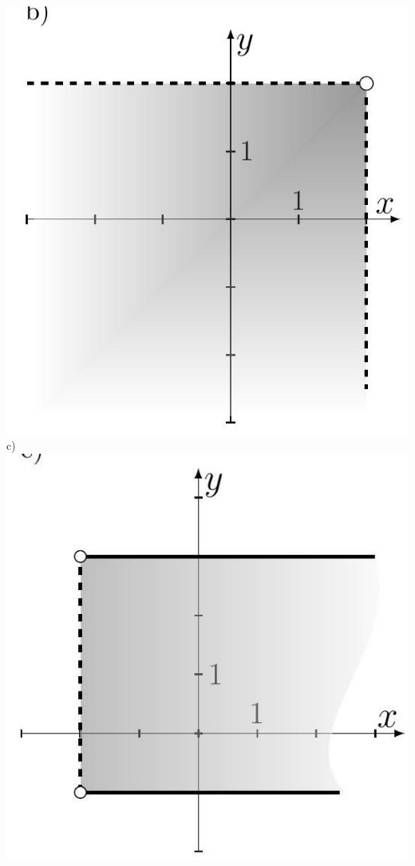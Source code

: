 \documentclass[10pt]{article}
\begin{document}
\begin{enumerate}
\includegraphics[max width=\textwidth, center]{2024_11_21_8f01584889ff06348ae7g-068(1)}\\
c)\\
\includegraphics[max width=\textwidth, center]{2024_11_21_8f01584889ff06348ae7g-068}\\

\end{enumerate}
\end{document}
